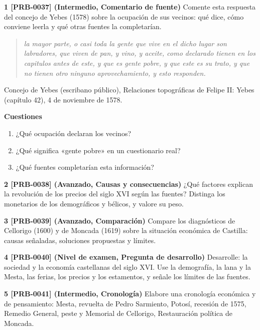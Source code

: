 \documentclass{book}
\begin{document}
\begin{tcolorbox}[title={Ejercicios}, studiumworked, breakable]

\noindent\textbf{1 [PRB-0037] (Intermedio, Comentario de fuente)}
Comente esta respuesta del concejo de Yebes (1578) sobre la ocupación de sus vecinos: qué dice, cómo conviene leerla y qué otras fuentes la completarían.


\begin{quote}
\itshape la mayor parte, o casi toda la gente que vive en el dicho lugar son labradores, que viven de pan, y vino, y aceite, como declarado tienen en los capitulos antes de este, y que es gente pobre, y que este es su trato, y que no tienen otro ninguno aprovechamiento, y esto responden.
\end{quote}
{\noindent\footnotesize Concejo de Yebes (escribano público), Relaciones topográficas de Felipe II: Yebes (capítulo 42), 4 de noviembre de 1578.\par}

\noindent\textbf{Cuestiones}
\begin{enumerate}
\item ¿Qué ocupación declaran los vecinos?
\item ¿Qué significa «gente pobre» en un cuestionario real?
\item ¿Qué fuentes completarían esta información?
\end{enumerate}

\noindent\textbf{2 [PRB-0038] (Avanzado, Causas y consecuencias)}
¿Qué factores explican la revolución de los precios del siglo XVI según las fuentes? Distinga los monetarios de los demográficos y bélicos, y valore su peso.


\noindent\textbf{3 [PRB-0039] (Avanzado, Comparación)}
Compare los diagnósticos de Cellorigo (1600) y de Moncada (1619) sobre la situación económica de Castilla: causas señaladas, soluciones propuestas y límites.


\noindent\textbf{4 [PRB-0040] (Nivel de examen, Pregunta de desarrollo)}
Desarrolle: la sociedad y la economía castellanas del siglo XVI. Use la demografía, la lana y la Mesta, las ferias, los precios y los estamentos, y señale los límites de las fuentes.


\noindent\textbf{5 [PRB-0041] (Intermedio, Cronología)}
Elabore una cronología económica y de pensamiento: Mesta, revuelta de Pedro Sarmiento, Potosí, recesión de 1575, Remedio General, peste y Memorial de Cellorigo, Restauración política de Moncada.

\end{tcolorbox}
\end{document}
